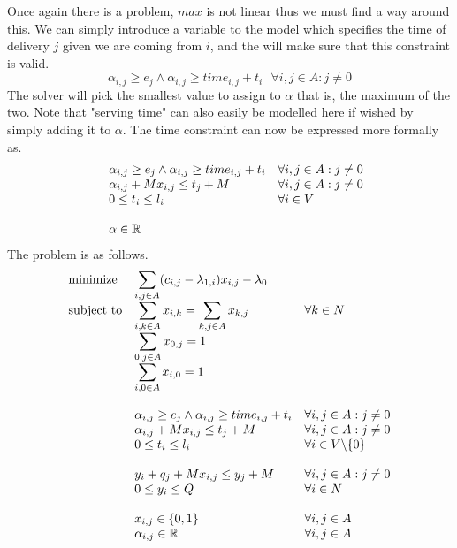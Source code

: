 \documentclass{article}
\begin{document}
    Once again there is a problem, $max$ is not linear thus we must find a way around this.
    We can simply introduce a variable to the model which specifies the time of delivery $j$ given we are coming from $i$, and the will make sure that this constraint is valid.
    \[
        \alpha_{i,j} \geq e_j \land \alpha_{i,j} \geq time_{i,j} + t_i \,\,\,\, \forall i,j \in A: j \neq 0
    \]
    The solver will pick the smallest value to assign to $\alpha$ that is, the maximum of the two.
    Note that "serving time" can also easily be modelled here if wished by simply adding it to $\alpha$.
    The time constraint can now be expressed more formally as.
    \begin{equation*}
        \begin{array}{ll@{}ll}
            & \displaystyle\alpha_{i,j} \geq e_j \land \alpha_{i,j} \geq time_{i,j} + t_i &&  \forall i,j \in A: j \neq 0\\
            & \displaystyle \alpha_{i,j} + Mx_{i,j} \leq t_j + M  && \forall i,j \in A: j \neq 0\\
            & \displaystyle0 \leq t_i \leq l_i &&  \forall i \in V\\\\
            & \displaystyle \alpha \in \mathbb{R} &&\\
        \end{array}
    \end{equation*}
    The problem is as follows.
    \begin{equation*}
        \begin{array}{ll@{}ll}
            \text{minimize}  & \displaystyle\sum_{i,j \in A} ( c_{i, j} - \lambda_{1,i})x_{i,j} - \lambda_0&&\\
            \text{subject to}& \displaystyle\sum_{i, k \in A}x_{i,k} = \sum_{k, j \in A}x_{k,j} &&\forall k \in N\\
            & \displaystyle\sum_{0,j \in A}x_{0,j} = 1 &&\\
            & \displaystyle\sum_{i,0 \in A}x_{i,0} = 1 &&\\\\
            & \displaystyle\alpha_{i,j} \geq e_j \land \alpha_{i,j} \geq time_{i,j} + t_i &&  \forall i,j \in A: j \neq 0\\
            & \displaystyle \alpha_{i,j} + Mx_{i,j} \leq t_j + M  && \forall i,j \in A: j \neq 0\\
            & \displaystyle0 \leq t_i \leq l_i &&  \forall i \in V \backslash \{ 0 \}\\\\
            & \displaystyle y_i + q_j + M x_{i,j} \leq y_j + M & & \forall i,j \in A : j \neq 0\\
            & \displaystyle 0 \leq y_i \leq Q && \forall i \in N \\\\
            & \displaystyle x_{i,j} \in \{0,1\} && \forall i,j \in A\\
            & \displaystyle \alpha_{i,j} \in \mathbb{R} && \forall i,j \in A
        \end{array}
    \end{equation*}
\end{document}
